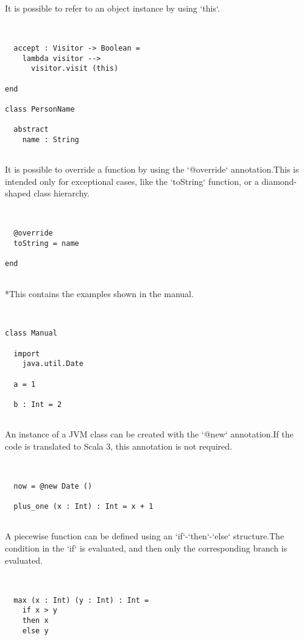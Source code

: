 \documentclass[12pt,a4paper]{article}
\begin{document}
It is possible to refer to an object instance by using `this`. 


\begin{lstlisting}


  accept : Visitor -> Boolean =
    lambda visitor -->
      visitor.visit (this)

end

class PersonName

  abstract
    name : String


\end{lstlisting}

It is possible to override a function by using the `@override` annotation.This is intended only for exceptional cases, like the `toString` function, or a diamond-shaped class hierarchy. 


\begin{lstlisting}


  @override
  toString = name

end


\end{lstlisting}

  *This contains the examples shown in the manual.


\begin{lstlisting}


class Manual

  import
    java.util.Date

  a = 1

  b : Int = 2


\end{lstlisting}

An instance of a JVM class can be created with the `@new` annotation.If the code is translated to Scala 3, this annotation is not required. 


\begin{lstlisting}


  now = @new Date ()

  plus_one (x : Int) : Int = x + 1


\end{lstlisting}

A piecewise function can be defined using an `if`-`then`-`else` structure.The condition in the `if` is evaluated, and then only the corresponding branch is evaluated. 


\begin{lstlisting}


  max (x : Int) (y : Int) : Int =
    if x > y
    then x
    else y


\end{lstlisting}
\end{document}
